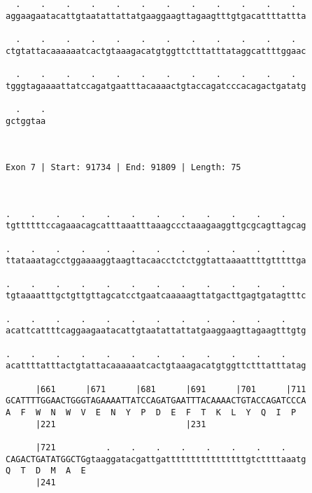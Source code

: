\documentclass{article}
\begin{document}
\begin{Verbatim}
  .    .    .    .    .    .    .    .    .    .    .    .  
aggaagaatacattgtaatattattatgaaggaagttagaagtttgtgacattttattta
                                                            
  .    .    .    .    .    .    .    .    .    .    .    .  
ctgtattacaaaaaatcactgtaaagacatgtggttctttatttataggcattttggaac
                                                            
  .    .    .    .    .    .    .    .    .    .    .    .  
tgggtagaaaattatccagatgaatttacaaaactgtaccagatcccacagactgatatg
                                                            
  .    .
gctggtaa
        
        
 
Exon 7 | Start: 91734 | End: 91809 | Length: 75



.    .    .    .    .    .    .    .    .    .    .    .    
tgttttttccagaaacagcatttaaatttaaagccctaaagaaggttgcgcagttagcag
                                                            
.    .    .    .    .    .    .    .    .    .    .    .    
ttataaatagcctggaaaaggtaagttacaacctctctggtattaaaattttgtttttga
                                                            
.    .    .    .    .    .    .    .    .    .    .    .    
tgtaaaatttgctgttgttagcatcctgaatcaaaaagttatgacttgagtgatagtttc
                                                            
.    .    .    .    .    .    .    .    .    .    .    .    
acattcattttcaggaagaatacattgtaatattattatgaaggaagttagaagtttgtg
                                                            
.    .    .    .    .    .    .    .    .    .    .    .    
acattttatttactgtattacaaaaaatcactgtaaagacatgtggttctttatttatag
                                                            
      |661      |671      |681      |691      |701      |711
GCATTTTGGAACTGGGTAGAAAATTATCCAGATGAATTTACAAAACTGTACCAGATCCCA
A  F  W  N  W  V  E  N  Y  P  D  E  F  T  K  L  Y  Q  I  P  
      |221                          |231                    
  
      |721          .    .    .    .    .    .    .    .    
CAGACTGATATGGCTGgtaaggatacgattgattttttttttttttttgtcttttaaatg
Q  T  D  M  A  E                                            
      |241                                                  
  

\end{Verbatim}
\end{document}
